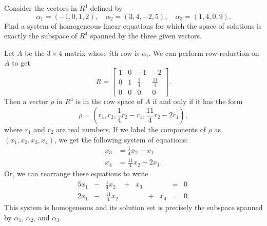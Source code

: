  Consider the vectors in $R^4$ defined by
\begin{equation*}
  \alpha_1 = (-1, 0, 1, 2), \quad
  \alpha_2 = (3, 4, -2, 5), \quad
  \alpha_3 = (1, 4, 0, 9).
\end{equation*}
Find a system of homogeneous linear equations for which the space of
solutions is exactly the subspace of $R^4$ spanned by the three given
vectors.
\begin{solution}
  Let $A$ be the $3\times4$ matrix whose $i$th row is $\alpha_i$. We
  can perform row-reduction on $A$ to get
  \begin{equation*}
    R =
    \begin{bmatrix}
      1 & 0 & -1 & -2 \\[3pt]
      0 & 1 & \frac14 & \frac{11}4 \\[3pt]
      0 & 0 & 0 & 0
    \end{bmatrix}.
  \end{equation*}
  Then a vector $\rho$ in $R^4$ is in the row space of $A$ if and only
  if it has the form
  \begin{equation*}
    \rho = \left(r_1, r_2, \frac14r_2 - r_1, \frac{11}4r_2 - 2r_1\right),
  \end{equation*}
  where $r_1$ and $r_2$ are real numbers. If we label the components
  of $\rho$ as $(x_1,x_2,x_3,x_4)$, we get the following system of
  equations:
  \begin{align*}
    x_3 &= \frac14x_2 - x_1 \\
    x_4 &= \frac{11}4x_2 - 2x_1.
  \end{align*}
  Or, we can rearrange these equations to write
  \begin{alignat*}{5}
    x_1 &{}-{}& \frac14x_2 &{}+{}& x_3 && &{}={}& 0 \\
    2x_1 &{}-{}& \frac{11}4x_2 && &{}+{}& x_4 &{}={}& 0.
  \end{alignat*}
  This system is homogeneous and its solution set is precisely the
  subspace spanned by $\alpha_1$, $\alpha_2$, and $\alpha_3$.
\end{solution}

